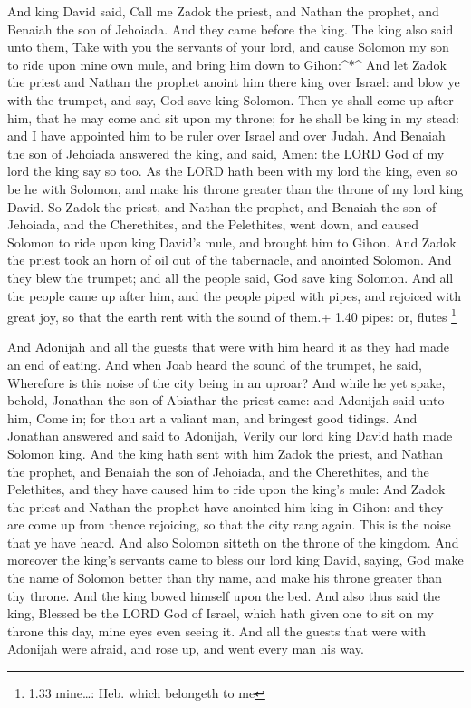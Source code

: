  And king David said, Call me Zadok the priest, and Nathan
the prophet, and Benaiah the son of Jehoiada. And they came before the
king.  The king also said unto them, Take with you the
servants of your lord, and cause Solomon my son to ride upon mine own
mule, and bring him down to Gihon:\^{}*\^{}  And let Zadok
the priest and Nathan the prophet anoint him there king over Israel: and
blow ye with the trumpet, and say, God save king Solomon. 
Then ye shall come up after him, that he may come and sit upon my
throne; for he shall be king in my stead: and I have appointed him to be
ruler over Israel and over Judah.  And Benaiah the son of
Jehoiada answered the king, and said, Amen: the LORD God of my lord the
king say so too.  As the LORD hath been with my lord the
king, even so be he with Solomon, and make his throne greater than the
throne of my lord king David.  So Zadok the priest, and
Nathan the prophet, and Benaiah the son of Jehoiada, and the
Cherethites, and the Pelethites, went down, and caused Solomon to ride
upon king David's mule, and brought him to Gihon.  And
Zadok the priest took an horn of oil out of the tabernacle, and anointed
Solomon. And they blew the trumpet; and all the people said, God save
king Solomon.  And all the people came up after him, and
the people piped with pipes, and rejoiced with great joy, so that the
earth rent with the sound of them.+ 1.40 pipes: or, flutes \footnote{1.33
  mine\ldots: Heb. which belongeth to me}

 And Adonijah and all the guests that were with him heard
it as they had made an end of eating. And when Joab heard the sound of
the trumpet, he said, Wherefore is this noise of the city being in an
uproar?  And while he yet spake, behold, Jonathan the son
of Abiathar the priest came: and Adonijah said unto him, Come in; for
thou art a valiant man, and bringest good tidings.  And
Jonathan answered and said to Adonijah, Verily our lord king David hath
made Solomon king.  And the king hath sent with him Zadok
the priest, and Nathan the prophet, and Benaiah the son of Jehoiada, and
the Cherethites, and the Pelethites, and they have caused him to ride
upon the king's mule:  And Zadok the priest and Nathan the
prophet have anointed him king in Gihon: and they are come up from
thence rejoicing, so that the city rang again. This is the noise that ye
have heard.  And also Solomon sitteth on the throne of the
kingdom.  And moreover the king's servants came to bless
our lord king David, saying, God make the name of Solomon better than
thy name, and make his throne greater than thy throne. And the king
bowed himself upon the bed.  And also thus said the king,
Blessed be the LORD God of Israel, which hath given one to sit on my
throne this day, mine eyes even seeing it.  And all the
guests that were with Adonijah were afraid, and rose up, and went every
man his way.

